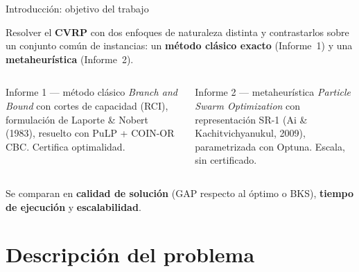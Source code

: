 \documentclass[aspectratio=169, 11pt, xcolor={dvipsnames,table}]{beamer}
\newcommand{\azul}[1]{\textcolor{UsachAzul}{#1}}
\newcommand{\naranja}[1]{\textcolor{UsachNaranja}{#1}}
\begin{document}
\begin{frame}{Introducción: objetivo del trabajo}
\begin{ideaclave}
\footnotesize
Resolver el \textbf{CVRP} con dos enfoques de naturaleza distinta y \azul{contrastarlos}
sobre un conjunto común de instancias: un \textbf{método clásico exacto} (Informe~1) y una
\textbf{metaheurística} (Informe~2).
\end{ideaclave}
\vspace{6pt}
\begin{columns}[T]
\begin{block}{Informe 1 --- método clásico}
\scriptsize
\textit{Branch and Bound} con cortes de capacidad (RCI), formulación de Laporte \& Nobert
(1983), resuelto con PuLP + COIN-OR CBC. \azul{Certifica optimalidad}.
\end{block}
\begin{alertblock}{Informe 2 --- metaheurística}
\scriptsize
\textit{Particle Swarm Optimization} con representación SR-1 (Ai \& Kachitvichyanukul,
2009), parametrizada con Optuna. \naranja{Escala}, sin certificado.
\end{alertblock}
\end{columns}
\vspace{8pt}
{\footnotesize Se comparan en \textbf{calidad de solución} (GAP respecto al óptimo o BKS), \textbf{tiempo de ejecución} y \textbf{escalabilidad}.}
\end{frame}

\section{Descripción del problema}
\end{document}
